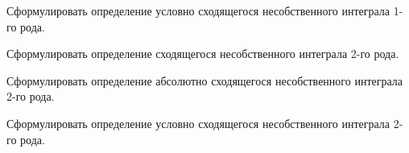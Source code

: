 \begin{question}
	Сформулировать определение условно сходящегося несобственного интеграла 1-го рода.
\end{question}

\begin{question}
	Сформулировать определение сходящегося несобственного интеграла 2-го рода.
\end{question}

\begin{question}
	Сформулировать определение абсолютно сходящегося несобственного интеграла 2-го рода.
\end{question}

\begin{question}
	Сформулировать определение условно сходящегося несобственного интеграла 2-го рода.
\end{question}

